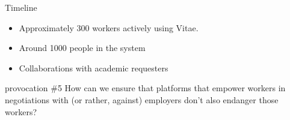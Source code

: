 \documentclass[presentation]{subfiles}
\begin{document}
\begin{frame}{Timeline}

  \begin{itemize}
    \item<+-> Approximately 300 workers actively using Vitae.
    \item<+-> Around 1000 people in the system
    \item<+-> Collaborations with academic requesters
  \end{itemize}

\end{frame}

\begin{frame}[standout]{provocation \#5}
  How can we ensure that platforms that empower workers in negotiations with (or rather, \alert{against}) employers don't also \alert{endanger} those workers?
\end{frame}

\end{document}
